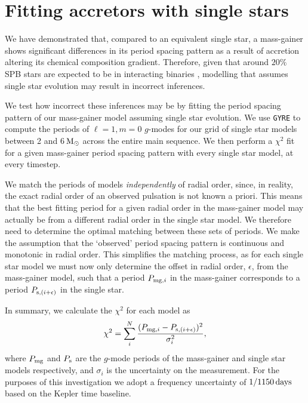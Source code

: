 \documentclass[desactivate]{aa}
\begin{document}
\section{Fitting accretors with single stars} \label{sec:fitting}

We have demonstrated that, compared to an equivalent single star, a mass-gainer shows significant differences in its period spacing pattern as a result of accretion altering its chemical composition gradient. Therefore, given that around $20\%$ SPB stars are expected to be in interacting binaries \citep{Sana+2012,deMink+2014}, modelling that assumes single star evolution may result in incorrect inferences.

We test how incorrect these inferences may be by fitting the period spacing pattern of our mass-gainer model assuming single star evolution. We use \texttt{GYRE} to compute the periods of $\ell = 1, m = 0$ $g$-modes for our grid of single star models between 2 and 6$\,{\rm M_\odot}$ across the entire main sequence. We then perform a $\chi^2$ fit for a given mass-gainer period spacing pattern with every single star model, at every timestep.

We match the periods of models \textit{independently} of radial order, since, in reality, the exact radial order of an observed pulsation is not known a priori. This means that the best fitting period for a given radial order in the mass-gainer model may actually be from a different radial order in the single star model. We therefore need to determine the optimal matching between these sets of periods. We make the assumption that the `observed' period spacing pattern is continuous and monotonic in radial order. This simplifies the matching process, as for each single star model we must now only determine the offset in radial order, $\epsilon$, from the mass-gainer model, such that a period $P_{{\rm mg}, i}$ in the mass-gainer corresponds to a period $P_{{\rm s}, (i + \epsilon)}$ in the single star.

In summary, we calculate the $\chi^2$ for each model as
\begin{equation}
    \chi^2 = \sum_{i}^{N} \frac{(P_{{\rm mg}, i} - P_{{\rm s}, (i + \epsilon)})^2}{\sigma_i^2},
\end{equation}
where $P_{\rm mg}$ and $P_{\rm s}$ are the $g$-mode periods of the mass-gainer and single star models respectively, and $\sigma_i$ is the uncertainty on the measurement. For the purposes of this investigation we adopt a frequency uncertainty of $1 / 1150 \, {\rm days}$ based on the Kepler time baseline.
\end{document}
